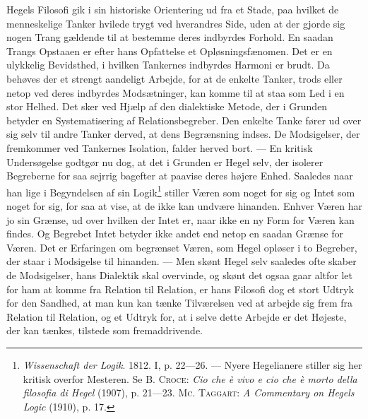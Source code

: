 \documentclass[12pt]{article}
\newcommand{\opage}[1]{\marginnote{\footnotesize\textit{[#1]}}}
\begin{document}
Hegels Filosofi gik i sin historiske Orientering ud fra et Stade, paa hvilket
de menneskelige Tanker hvilede trygt ved hverandres Side, uden at der gjorde
sig nogen Trang gældende til at bestemme deres indbyrdes Forhold. En saadan
Trangs Opstaaen er efter hans Opfattelse et Opløsningsfænomen. Det er en
ulykkelig Bevidsthed, i hvilken Tankernes indbyrdes Harmoni er brudt. Da
behøves
\opage{12} \setcounter{footnote}{0}
der et strengt aandeligt Arbejde, for at de enkelte Tanker, trods eller netop
ved deres indbyrdes Modsætninger, kan komme til at staa som Led i en stor
Helhed. Det sker ved Hjælp af den dialektiske Metode, der i Grunden betyder en
Systematisering af Relationsbegreber. Den enkelte Tanke fører ud over sig selv
til andre Tanker derved, at dens Begrænsning indses. De Modsigelser, der
fremkommer ved Tankernes Isolation, falder herved bort. --- En kritisk
Undersøgelse godtgør nu dog, at det i Grunden er Hegel selv, der isolerer
Begreberne for saa sejrrig bagefter at paavise deres højere Enhed. Saaledes
naar han lige i Begyndelsen af sin
Logik\footnote{\textit{Wissenschaft der Logik}. 1812. I, p. 22---26. --- Nyere
Hegelianere stiller sig her kritisk overfor Mesteren. Se \textsc{B. Croce}:
\textit{Cio che è vivo e cio che è morto della filosofia di Hegel} (1907),
p. 21---23. \textsc{Mc. Taggart}: \textit{A Commentary on Hegels Logic}
(1910), p. 17.}
stiller \guillemotright Væren\guillemotleft{} som noget for sig og
\guillemotright Intet\guillemotleft{} som noget for sig, for saa at vise, at
de ikke kan undvære hinanden. Enhver Væren har jo sin Grænse, ud over hvilken
der Intet er, naar ikke en ny Form for Væren kan findes. Og Begrebet Intet
betyder ikke andet end netop en saadan Grænse for Væren. Det er Erfaringen om
begrænset Væren, som Hegel opløser i to Begreber, der staar i Modsigelse til
hinanden. --- Men skønt Hegel selv saaledes ofte skaber de Modsigelser, hans
Dialektik skal overvinde, og skønt det ogsaa gaar altfor let for ham at komme
fra Relation til Relation, er hans Filosofi dog et stort Udtryk for den
Sandhed, at man kun kan tænke Tilværelsen ved at arbejde sig frem fra Relation
til Relation, og et Udtryk for, at i selve dette Arbejde er det Højeste, der
kan tænkes, tilstede som fremaddrivende.
\end{document}
